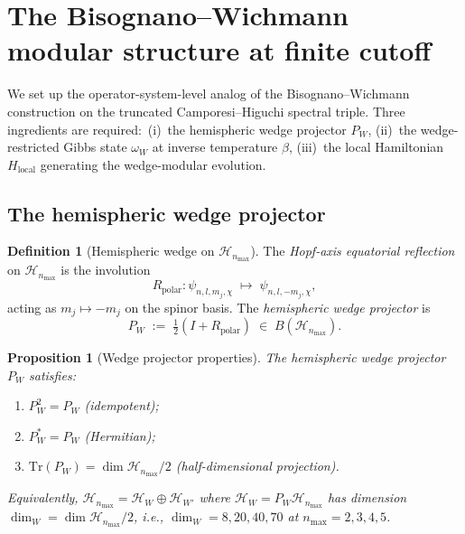 \documentclass[11pt,a4paper]{article}
\theoremstyle{plain}
\newtheorem{proposition}[theorem]{Proposition}
\theoremstyle{definition}
\newtheorem{definition}[theorem]{Definition}
\newcommand{\nmax}{n_{\max}}
\newcommand{\Hilb}{\mathcal{H}}
\newcommand{\Tr}{\mathrm{Tr}}
\begin{document}
\section{The Bisognano--Wichmann modular structure at finite cutoff}
\label{sec:bw_at_finite_cutoff}

We set up the operator-system-level analog of the
Bisognano--Wichmann construction on the truncated Camporesi--Higuchi
spectral triple. Three ingredients are required:\ (i)~the hemispheric
wedge projector $P_W$, (ii)~the wedge-restricted Gibbs state
$\omega_W$ at inverse temperature $\beta$, (iii)~the local Hamiltonian
$H_{\mathrm{local}}$ generating the wedge-modular evolution.

\subsection{The hemispheric wedge projector}\label{sec:hemispheric_wedge}

\begin{definition}[Hemispheric wedge on $\Hilb_{\nmax}$]
\label{def:wedge}
The \emph{Hopf-axis equatorial reflection} on $\Hilb_{\nmax}$ is the
involution
\begin{equation}\label{eq:R_polar_def}
   R_{\mathrm{polar}}: \psi_{n, l, m_j, \chi}
   \;\longmapsto\; \psi_{n, l, -m_j, \chi},
\end{equation}
acting as $m_j \mapsto -m_j$ on the spinor basis. The
\emph{hemispheric wedge projector} is
\begin{equation}\label{eq:P_W_def}
   P_W \;:=\; \tfrac{1}{2}(I + R_{\mathrm{polar}})
   \;\in\; B(\Hilb_{\nmax}).
\end{equation}
\end{definition}

\begin{proposition}[Wedge projector properties]\label{prop:wedge_properties}
The hemispheric wedge projector $P_W$ satisfies:
\begin{enumerate}\setlength{\itemsep}{2pt}
\item[(a)] $P_W^2 = P_W$ (idempotent);
\item[(b)] $P_W^* = P_W$ (Hermitian);
\item[(c)] $\Tr(P_W) = \dim \Hilb_{\nmax} / 2$ (half-dimensional
projection).
\end{enumerate}
Equivalently, $\Hilb_{\nmax} = \Hilb_W \oplus \Hilb_{W'}$ where
$\Hilb_W = P_W \Hilb_{\nmax}$ has dimension $\dim_W = \dim \Hilb_{\nmax}/2$,
i.e., $\dim_W = 8, 20, 40, 70$ at $\nmax = 2, 3, 4, 5$.
\end{proposition}
\end{document}

